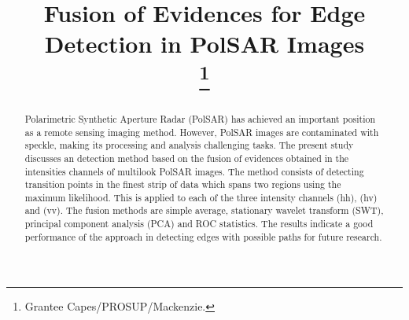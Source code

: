 \documentclass[conference]{IEEEtran}
\begin{document}
\title{Fusion of Evidences for Edge Detection in PolSAR Images\\
\thanks{Grantee Capes/PROSUP/Mackenzie.}
}

\author{
\and
{}
\and
{}
}

\maketitle

\begin{abstract}
Polarimetric Synthetic Aperture Radar (PolSAR) has achieved an important position as a remote sensing imaging method. 
However, PolSAR images are contaminated with speckle, making its processing and analysis challenging tasks. 
The present study discusses an detection method based on the fusion of evidences obtained in the intensities channels of multilook PolSAR images.
The method consists of detecting transition points in the finest strip of data which spans two regions using the maximum likelihood.
This is applied to each of the three intensity channels (hh), (hv) and (vv). 
The fusion methods are simple average, stationary wavelet transform (SWT), principal component analysis (PCA) and ROC statistics.  
The results indicate a good performance of the approach in detecting edges with possible paths for future research.
\end{abstract}
\end{document}
